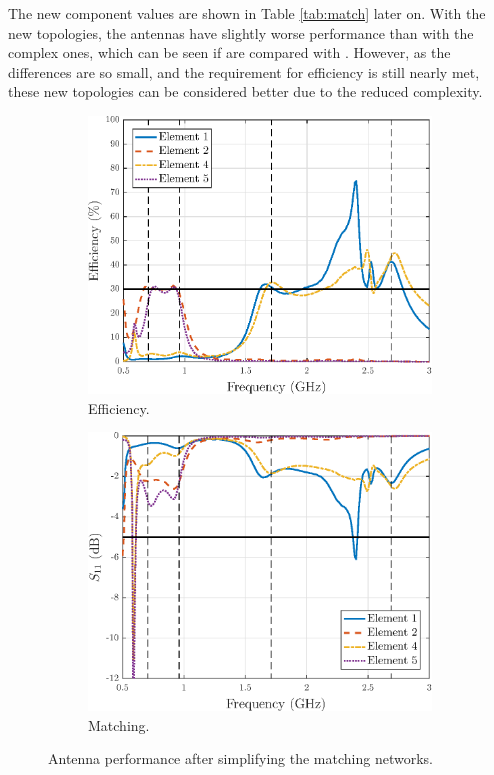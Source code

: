 The new component values are shown in Table \ref{tab:match} later on. With the new topologies, the antennas have slightly worse performance than with the complex ones, which can be seen if  are compared with . However, as the differences are so small, and the requirement for efficiency is still nearly met, these new topologies can be considered better due to the reduced complexity.
\begin{figure}[H]
    \centering
    \begin{subfigure}[b]{0.49\textwidth}
        \includegraphics[width=\textwidth]{img/diversity_eff_ideal.eps}
        \caption{Efficiency.}
        \label{fig:div_eff_ideal}
    \end{subfigure}
    \begin{subfigure}[b]{0.49\textwidth}
        \includegraphics[width=\textwidth]{img/diversity_final_match.eps}
        \caption{Matching.}
        \label{fig:div_ideal_match}
    \end{subfigure}
    \caption{Antenna performance after simplifying the matching networks.}
    \label{fig:div_eff}
\end{figure}

